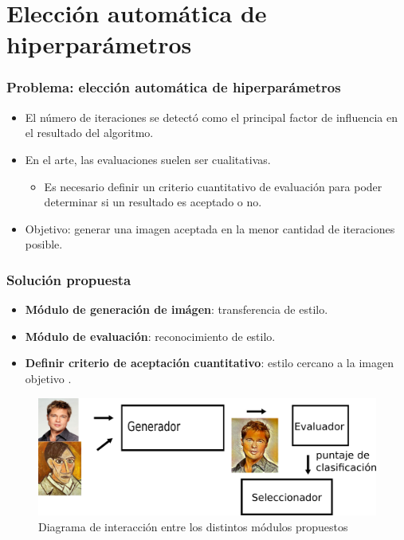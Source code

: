 \documentclass[10pt,center]{beamer}
\begin{document}
\section{Elección automática de hiperparámetros}
\begin{frame}
  \frametitle{Problema: elección automática de hiperparámetros}
  \begin{itemize}
   \item El número de iteraciones se detectó como el principal factor de influencia en el resultado del algoritmo. \vspace{0.5cm}
   \item En el arte, las evaluaciones suelen ser cualitativas.
   \begin{itemize}
    \item Es necesario definir un criterio cuantitativo de evaluación para poder determinar si un resultado es aceptado o no. \vspace{0.5cm}
   \end{itemize}
  \item Objetivo: generar una imagen aceptada en la menor cantidad de iteraciones posible.
  \end{itemize}

\end{frame}

\begin{frame}
 \frametitle{Solución propuesta}
  \begin{itemize}
   \item \textbf{Módulo de generación de imágen}: transferencia de estilo.
   \item \textbf{Módulo de evaluación}: reconocimiento de estilo.
   \item \textbf{Definir criterio de aceptación cuantitativo}: estilo cercano a la imagen objetivo .
  \end{itemize}
  \begin{figure}[h]
  \captionsetup[subfigure]{labelformat=empty}
    \begin{center}
      \includegraphics[width=\linewidth]{./img/diagrama.png}
    \end{center}
    \caption{Diagrama de interacción entre los distintos módulos propuestos}
  \end{figure}
\end{frame}
\end{document}
